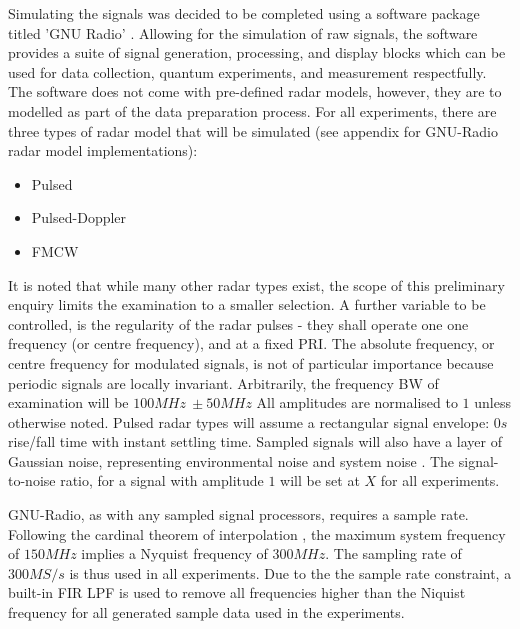 Simulating the signals was decided to be completed using a software package titled 'GNU Radio' \cite{gnu_radio_contributors_gnu_2022}.
Allowing for the simulation of raw signals, the software provides a suite of signal generation, processing, and display blocks which can be used for data collection, quantum experiments, and measurement respectfully.
The software does not come with pre-defined radar models, however, they are to modelled as part of the data preparation process.
For all experiments, there are three types of radar model that will be simulated (see appendix for GNU-Radio radar model implementations):
\begin{itemize}
    \item Pulsed
    \item Pulsed-Doppler
    \item \ac{FMCW}
\end{itemize}
It is noted that while many other radar types exist, the scope of this preliminary enquiry limits the examination to a smaller selection.
A further variable to be controlled, is the regularity of the radar pulses - they shall operate one one frequency (or centre frequency), and at a fixed \ac{PRI}.
The absolute frequency, or centre frequency for modulated signals, is not of particular importance because periodic signals are locally invariant.
Arbitrarily, the frequency \ac{BW} of examination will be \(100MHz\ \pm 50MHz\)
All amplitudes are normalised to \(1\) unless otherwise noted.
Pulsed radar types will assume a rectangular signal envelope: \(0s\) rise/fall time with instant settling time.
Sampled signals will also have a layer of Gaussian noise, representing environmental noise and system noise .
The signal-to-noise ratio, for a signal with amplitude \(1\) will be set at \textbf{\(X\)} for all experiments.

GNU-Radio, as with any sampled signal processors, requires a sample rate.
Following the cardinal theorem of interpolation \cite{nyquist_certain_1928}, the maximum system frequency of \(150MHz\) implies a Nyquist frequency of \(300MHz\).
The sampling rate of \(300MS/s\) is thus used in all experiments.
Due to the the sample rate constraint, a built-in \ac{FIR} \ac{LPF} is used to remove all frequencies higher than the Niquist frequency for all generated sample data used in the experiments.

